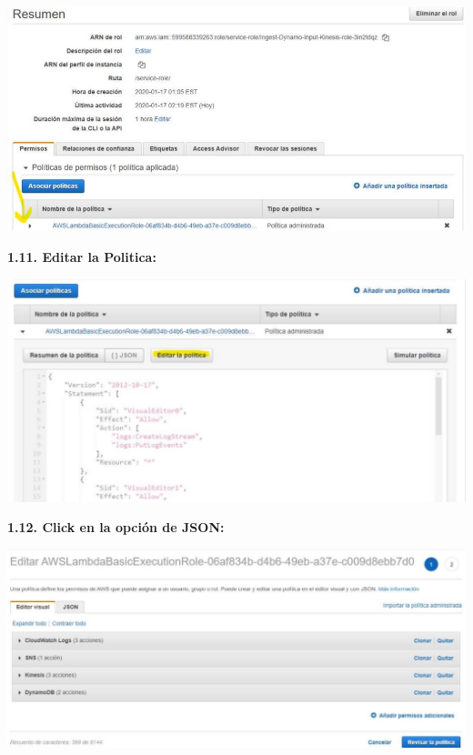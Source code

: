 \documentclass{article}
\begin{document}
    \begin{center}
		\includegraphics[width=15cm]{./images/11} 
	\end{center}
	
	
		
	\newpage
\textbf{1.11.  Editar la Politica:
}

    \begin{center}
		\includegraphics[width=15cm]{./images/12} 
	\end{center}
	
	
	\textbf{1.12.  Click en la opción de JSON:
}

    \begin{center}
		\includegraphics[width=15cm]{./images/13} 
	\end{center}
	
\end{document}
